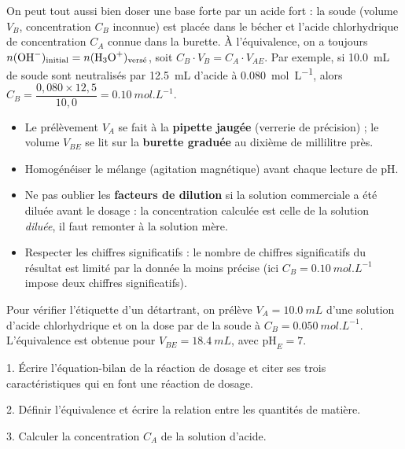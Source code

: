 \documentclass[11pt]{article}
\begin{document}
\begin{exemplebox}
On peut tout aussi bien doser une base forte par un acide fort : la soude (volume $V_B$, concentration $C_B$ inconnue) est placée dans le bécher et l'acide chlorhydrique de concentration $C_A$ connue dans la burette. À l'équivalence, on a toujours $n(\ce{OH-})_{\text{initial}} = n(\ce{H3O+})_{\text{versé}}$, soit $C_B \cdot V_B = C_A \cdot V_{AE}$. Par exemple, si \SI{10,0}{mL} de soude sont neutralisés par \SI{12,5}{mL} d'acide à \SI{0,080}{mol.L^{-1}}, alors $C_B = \dfrac{0{,}080 \times 12{,}5}{10{,}0} = \SI{0,10}{mol.L^{-1}}$.
\end{exemplebox}

\begin{attention}
\begin{itemize}
\item Le prélèvement $V_A$ se fait à la \textbf{pipette jaugée} (verrerie de précision) ; le volume $V_{BE}$ se lit sur la \textbf{burette graduée} au dixième de millilitre près.
\item Homogénéiser le mélange (agitation magnétique) avant chaque lecture de pH.
\item Ne pas oublier les \textbf{facteurs de dilution} si la solution commerciale a été diluée avant le dosage : la concentration calculée est celle de la solution \emph{diluée}, il faut remonter à la solution mère.
\item Respecter les chiffres significatifs : le nombre de chiffres significatifs du résultat est limité par la donnée la moins précise (ici $C_B = \SI{0,10}{mol.L^{-1}}$ impose deux chiffres significatifs).
\end{itemize}
\end{attention}

\begin{exercice}
Pour vérifier l'étiquette d'un détartrant, on prélève $V_A = \SI{10,0}{mL}$ d'une solution d'acide chlorhydrique et on la dose par de la soude à $C_B = \SI{0,050}{mol.L^{-1}}$. L'équivalence est obtenue pour $V_{BE} = \SI{18,4}{mL}$, avec $\mathrm{pH}_E = 7$.\par
1. Écrire l'équation-bilan de la réaction de dosage et citer ses trois caractéristiques qui en font une réaction de dosage.\par
2. Définir l'équivalence et écrire la relation entre les quantités de matière.\par
3. Calculer la concentration $C_A$ de la solution d'acide.
\end{exercice}
\end{document}

